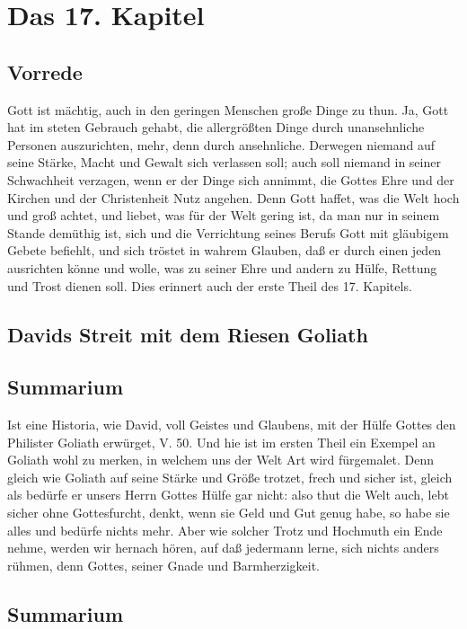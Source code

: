 \chapter{Das 17. Kapitel}

\section{Vorrede}

Gott ist mächtig, auch in den geringen Menschen große Dinge zu thun. Ja, Gott hat im steten Gebrauch gehabt, die allergrößten Dinge durch unansehnliche Personen auszurichten, mehr, denn durch ansehnliche. Derwegen niemand auf seine Stärke, Macht und Gewalt sich verlassen soll; auch soll niemand in seiner Schwachheit verzagen, wenn er der Dinge sich annimmt, die Gottes Ehre und der Kirchen und der Christenheit Nutz angehen. Denn Gott haffet, was die Welt hoch und groß achtet, und liebet, was für der Welt gering ist, da man nur in seinem Stande demüthig ist, sich und die Verrichtung seines Berufs Gott mit gläubigem Gebete befiehlt, und sich tröstet in wahrem Glauben, daß er durch einen jeden ausrichten könne und wolle, was zu seiner Ehre und andern zu Hülfe, Rettung und Trost dienen soll. Dies erinnert auch der erste Theil des 17. Kapitels.

\section{Davids Streit mit dem Riesen Goliath}

\section{Summarium}

Ist eine Historia, wie David, voll Geistes und Glaubens, mit der Hülfe Gottes den Philister Goliath erwürget, V. 50. Und hie ist im ersten Theil ein Exempel an Goliath wohl zu merken, in welchem uns der Welt Art wird fürgemalet. Denn gleich wie Goliath auf seine Stärke und Größe trotzet, frech und sicher ist, gleich als bedürfe er unsers Herrn Gottes Hülfe gar nicht: also thut die Welt auch, lebt sicher ohne Gottesfurcht, denkt, wenn sie Geld und Gut genug habe, so habe sie alles und bedürfe nichts mehr. Aber wie solcher Trotz und Hochmuth ein Ende nehme, werden wir hernach hören, auf daß jedermann lerne, sich nichts anders rühmen, denn Gottes, seiner Gnade und Barmherzigkeit.

\section{Summarium}

